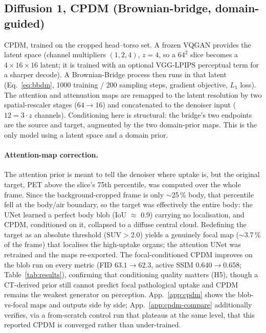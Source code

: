 \documentclass[11pt,a4paper]{article}
\newcommand{\num}[1]{#1}
\begin{document}
\subsection{Diffusion 1, CPDM (Brownian-bridge, domain-guided)}
\label{sec:cpdm-method}
CPDM, trained on the cropped head--torso set. A frozen VQGAN provides the latent space
(channel multipliers $(1,2,4)$, $z{=}4$, so a $64^2$ slice becomes a $4\times16\times16$ latent;
it is trained with an optional VGG-LPIPS perceptual term for a sharper decode). A Brownian-Bridge
process then runs in that latent (Eq.~\ref{eq:bbdm}, 1000 training / 200 sampling steps, gradient
objective, $L_1$ loss). The attention and attenuation maps are remapped to the latent resolution
by two spatial-rescaler stages ($64\!\to\!16$) and concatenated to the denoiser input
($12 = 3\cdot z$ channels). Conditioning here is structural: the bridge's two
endpoints are the source and target, augmented by the two domain-prior maps. This
is the only model using a latent space and a domain prior.

\paragraph{Attention-map correction.} The attention prior is meant to tell the
denoiser where uptake is, but the original target, PET above the slice's 75th
percentile, was computed over the whole frame. Since the background-cropped frame is only
$\sim$\num{25}\,\% body, that percentile fell at the body/air boundary, so the target was
effectively the entire body: the UNet learned a perfect body blob (IoU $\approx$
\num{0.9}) carrying no localisation, and CPDM, conditioned on it, collapsed to a diffuse
central cloud. Redefining the target as an absolute threshold (SUV$>$\num{2.0}) yields a
genuinely focal map ($\sim$\num{3.7}\,\% of the frame) that localises the high-uptake organs;
the attention UNet was retrained and the maps re-exported. The focal-conditioned CPDM improves
on the blob run on every metric (FID $63.1\!\to\!62.3$, active SSIM $0.640\!\to\!0.658$;
Table~\ref{tab:results}), confirming that conditioning quality matters (H5), though a
CT-derived prior still cannot predict focal pathological uptake and CPDM remains the weakest
generator on perception. App.~\ref{app:cpdm} shows the blob-vs-focal maps and outputs side by
side; App.~\ref{app:cpdm-compare} additionally verifies, via a from-scratch control run that
plateaus at the same level, that this reported CPDM is converged rather than under-trained.
\end{document}
